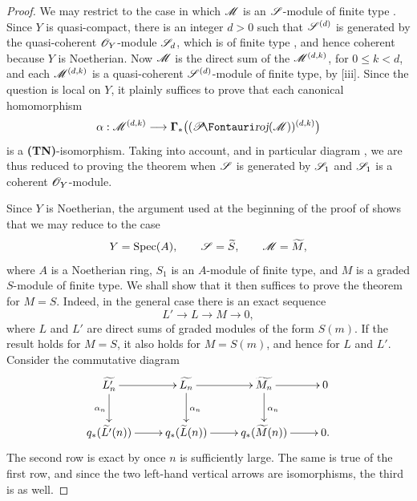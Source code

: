 \begin{proof}
We may restrict to the case in which $\mathscr{M}$ is an $\mathscr{S}$-module of finite type .
Since $Y$ is quasi-compact, there is an integer $d>0$ such that $\mathscr{S}^{(d)}$ is generated by the quasi-coherent $\mathscr{O}_Y$-module $\mathscr{S}_d$, which is of finite type , and hence coherent because $Y$ is Noetherian.
Now $\mathscr{M}$ is the direct sum of the $\mathscr{M}^{(d,k)}$, for $0\leq k<d$, and each $\mathscr{M}^{(d,k)}$ is a quasi-coherent $\mathscr{S}^{(d)}$-module of finite type, by [iii].
Since the question is local on $Y$, it plainly suffices to prove that each canonical homomorphism
\[
  \alpha:\sh{M}^{(d,k)}
  \longrightarrow
  \bbGamma_*\bigl((\shProj(\sh{M}))^{(d,k)}\bigr)
\]
is a \textbf{(TN)}-isomorphism.
Taking  into account, and in particular diagram , we are thus reduced to proving the theorem when $\mathscr{S}$ is generated by $\mathscr{S}_1$ and $\mathscr{S}_1$ is a coherent $\mathscr{O}_Y$-module.

Since $Y$ is Noetherian, the argument used at the beginning of the proof of  shows that we may reduce to the case
\[
  Y=\operatorname{Spec}(A),\qquad
  \mathscr{S}=\widetilde{S},\qquad
  \mathscr{M}=\widetilde{M},
\]
where $A$ is a Noetherian ring, $S_1$ is an $A$-module of finite type, and $M$ is a graded $S$-module of finite type.
We shall show that it then suffices to prove the theorem for $M=S$.
Indeed, in the general case there is an exact sequence
\[
  L'\longrightarrow L\longrightarrow M\longrightarrow0,
\]
where $L$ and $L'$ are direct sums of graded modules of the form $S(m)$.
If the result holds for $M=S$, it also holds for $M=S(m)$, and hence for $L$ and $L'$.
Consider the commutative diagram
\[
  \xymatrix{
    \widetilde{L'_n}\ar[r]\ar[d]_{\alpha_n} &
    \widetilde{L_n}\ar[r]\ar[d]^{\alpha_n} &
    \widetilde{M_n}\ar[r]\ar[d]^{\alpha_n} &
    0\\
    q_*(\widetilde{L'}(n))\ar[r] &
    q_*(\widetilde{L}(n))\ar[r] &
    q_*(\widetilde{M}(n))\ar[r] &
    0 .
  }
\]
The second row is exact by  once $n$ is sufficiently large.
The same is true of the first row, and since the two left-hand vertical arrows are isomorphisms, the third is as well.


\end{proof}
